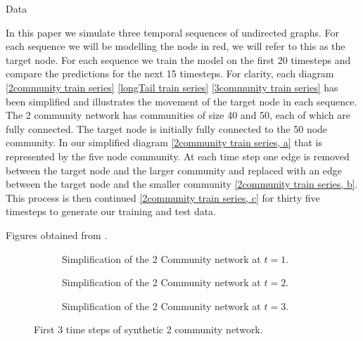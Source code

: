 \documentclass{article}
\begin{document}
\begin{section}{Data}

    In this paper we simulate three temporal sequences of undirected graphs. For each sequence we will be modelling the node in red, we will refer to this as the target node. For each sequence we train the model on the first 20 timesteps and compare the predictions for the next 15 timesteps. For clarity, each diagram \autoref{2community train series} \autoref{longTail train series} \autoref{3community train series} has been simplified and illustrates the movement of the target node in each sequence.\\
    
    The 2 community network has communities of size 40 and 50, each of which are fully connected. The target node is initially fully connected to the 50 node community. In our simplified diagram \autoref{2community train series, a} that is represented by the five node community. At each time step one edge is removed between the target node and the larger community and replaced with an edge between the target node and the smaller community \autoref{2community train series, b}. This process is then continued \autoref{2community train series, c} for thirty five timesteps to generate our training and test data.

    Figures obtained from \cite{Emma2023}.
    \begin{figure}[H]
        \centering
        \centering
        \begin{subfigure}[c]{0.3\textwidth}
            \centering
            \resizebox{.6\width}{!}{}
            \caption{Simplification of the 2 Community network at $t=1$.}
            \label{2community train series, a}
        \end{subfigure}
        \hfill
        \centering
        \begin{subfigure}[c]{0.3\textwidth}
            \centering
            \resizebox{.6\width}{!}{}
            \caption{Simplification of the 2 Community network at $t=2$.}
            \label{2community train series, b}
        \end{subfigure}
        \hfill
        \centering
        \begin{subfigure}[c]{0.3\textwidth}
            \centering
            \resizebox{.6\width}{!}{}
            \caption{Simplification of the 2 Community network at $t=3$.}
            \label{2community train series, c}
        \end{subfigure}
        \caption{First 3 time steps of synthetic 2 community network.}
        \label{2community train series}
    \end{figure}


\end{section}
\end{document}
